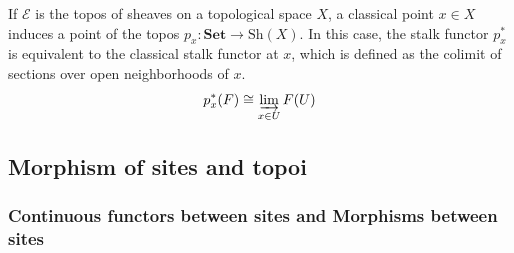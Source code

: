 



\TODO{}









\begin{remark}
    If $\mathcal{E}$ is the topos of sheaves on a topological space $X$, a classical point $x \in X$ induces a point of the topos $p_x: \mathbf{Set} \to \text{Sh}(X)$. In this case, the stalk functor $p_x^*$ is equivalent to the classical stalk functor at $x$, which is defined as the colimit of sections over open neighborhoods of $x$.
    $$ p_x^*(F) \cong \varinjlim_{x \in U} F(U) $$
\end{remark}








\subsection{Morphism of sites and topoi}


\subsubsection{Continuous functors between sites and Morphisms between sites}







